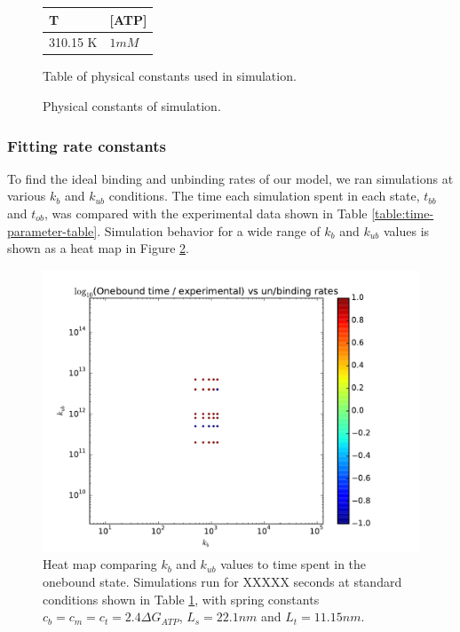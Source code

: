 \documentclass[10pt]{article} %
\begin{document}
\begin{figure}[h]
  \centering
  \begin{tabular}{| l | l |}
    \hline
    T & [ATP] \\ \hline
    310.15 K & $1mM$\\ \hline
  \end{tabular}
  \caption{Physical constants of simulation.}{Table of physical constants used in simulation.}
  \label{table:simulation-std-conditions}
\end{figure}

\subsubsection{Fitting rate constants}
To find the ideal binding and unbinding rates of our model, we ran simulations at various $k_b$ and $k_{ub}$ conditions. The time each simulation spent in each state, $t_{bb}$ and $t_{ob}$, was compared with the experimental data shown in Table \ref{table:time-parameter-table}. Simulation behavior for a wide range of $k_b$ and $k_{ub}$ values is shown as a heat map in Figure \ref{fig:kb-kub-heatmap}.\\

\begin{figure}[H]
  \centering
  \includegraphics[width=\textwidth]{../../figures/kb-kub-contour}
  \caption{Heat map comparing $k_b$ and $k_{ub}$ values to time spent in the onebound state. Simulations run for XXXXX seconds at standard conditions shown in Table \ref{table:simulation-std-conditions}, with spring constants $c_b = c_m = c_t = 2.4\Delta G_{ATP}$, $L_s=22.1nm$ and $L_t=11.15nm$.}
  \label{fig:kb-kub-heatmap}
\end{figure}
\end{document}
